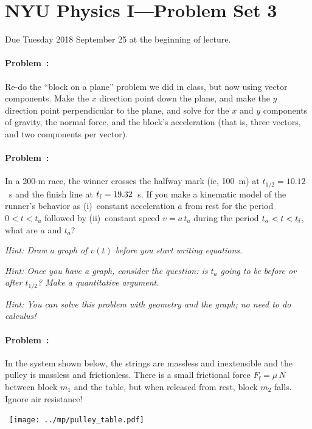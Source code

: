 \documentclass[12pt]{article}
\begin{document}
\section*{NYU Physics I---Problem Set 3}

Due Tuesday 2018 September 25 at the beginning of lecture.

\paragraph{Problem~\theproblem:}%
Re-do the ``block on a plane'' problem we did in class, but now using
vector components. Make the $x$ direction point down the plane, and
make the $y$ direction point perpendicular to the plane, and solve for
the $x$ and $y$ components of gravity, the normal force, and the
block's acceleration (that is, three vectors, and two components per
vector).

\paragraph{Problem~\theproblem:}%
In a 200-m race, the winner crosses the halfway mark (ie, 100~m) at
$t_{1/2}=10.12$~s and the finish line at $t_{\rm f}=19.32$~s.  If you
make a kinematic model of the runner's behavior as (i)~constant
acceleration $a$ from rest for the period $0<t<t_a$ followed by
(ii)~constant speed $v=a\,t_a$ during the period $t_a<t<t_{\rm f}$,
what are $a$ and $t_a$?

\emph{Hint: Draw a graph of $v(t)$ before you start writing equations.}

\emph{Hint: Once you have a graph, consider the question: is $t_a$
going to be before or after $t_{1/2}$?  Make a quantitative argument.}

\emph{Hint: You can solve this problem with geometry and the graph; no
  need to do calculus!}

\paragraph{Problem~\theproblem:}%

In the system shown below, the strings are massless and inextensible
and the pulley is massless and frictionless.  There is a small
frictional force $F_\mathrm{f}=\mu\,N$ between block $m_1$ and the
table, but when released from rest, block $m_2$ falls. Ignore air
resistance!

\noindent~\hfill\texttt{[image: ../mp/pulley\_table.pdf]}\hfill~
\end{document}
